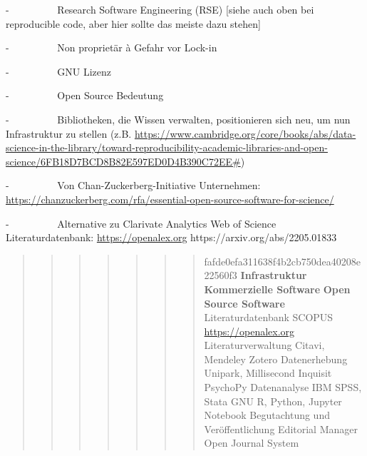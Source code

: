 \documentclass[
  letterpaper,
  DIV=11,
  numbers=noendperiod]{scrreprt}
\begin{document}
-~~~~~~~~~ Research Software Engineering (RSE) {[}siehe auch oben bei
reproducible code, aber hier sollte das meiste dazu stehen{]}

-~~~~~~~~~ Non proprietär à Gefahr vor Lock-in

-~~~~~~~~~ GNU Lizenz

-~~~~~~~~~ Open Source Bedeutung

-~~~~~~~~~ Bibliotheken, die Wissen verwalten, positionieren sich neu,
um nun Infrastruktur zu stellen (z.B.
\href{https://www.cambridge.org/core/books/abs/data-science-in-the-library/toward-reproducibility-academic-libraries-and-open-science/6FB18D7BCD8B82E597ED0D4B390C72EE}{https://www.cambridge.org/core/books/abs/data-science-in-the-library/toward-reproducibility-academic-libraries-and-open-science/6FB18D7BCD8B82E597ED0D4B390C72EE\#})

-~~~~~~~~~ Von Chan-Zuckerberg-Initiative Unternehmen:
\url{https://chanzuckerberg.com/rfa/essential-open-source-software-for-science/}

-~~~~~~~~~ Alternative zu Clarivate Analytics Web of Science
Literaturdatenbank: \url{https://openalex.org}
https://arxiv.org/abs/2205.01833

\begin{quote}
\begin{quote}
\begin{quote}
\begin{quote}
\begin{quote}
\begin{quote}
\begin{quote}
fafde0efa311638f4b2cb750dea40208e22560f3 \textbar{}
\textbf{Infrastruktur} \textbar{} \textbf{Kommerzielle Software}
\textbar{} \textbf{Open Source Software} \textbar{} \textbar{}
Literaturdatenbank \textbar{} SCOPUS \textbar{}
\url{https://openalex.org} \textbar{} \textbar{} Literaturverwaltung
\textbar{} Citavi, Mendeley \textbar{} Zotero \textbar{} \textbar{}
Datenerhebung \textbar{} Unipark, Millisecond Inquisit \textbar{}
PsychoPy \textbar{} \textbar{} Datenanalyse \textbar{} IBM SPSS, Stata
\textbar{} GNU R, Python, Jupyter Notebook \textbar{} \textbar{}
Begutachtung und Veröffentlichung \textbar{} Editorial Manager
\textbar{} Open Journal System \textbar{}
\end{quote}
\end{quote}
\end{quote}
\end{quote}
\end{quote}
\end{quote}
\end{quote}
\end{document}
